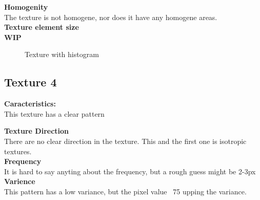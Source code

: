 \documentclass{article}
\begin{document}
\textbf{Homogenity}\\
The texture is not homogene, nor does it have any homogene areas.\\

\textbf{Texture element size}\\
\textbf{WIP}
\\

\begin{figure}[h]%
	\centering
    \qquad
    \caption{Texture with histogram}%
    \label{fig:IMG3}%
\end{figure}
\newpage

\subsection{Texture 4}
\textbf{Caracteristics:}\\
This texture has a clear pattern 

\textbf{Texture Direction}\\
There are no clear direction in the texture. This and the first one is isotropic textures.
\\ 
 
\textbf{Frequency} \\
It is hard to say anyting about the frequency, but a rough guess might be 2-3px\\ 


\textbf{Varience}\\
This pattern has a low variance, but the pixel value ~75 upping the variance.
\\
\end{document}
